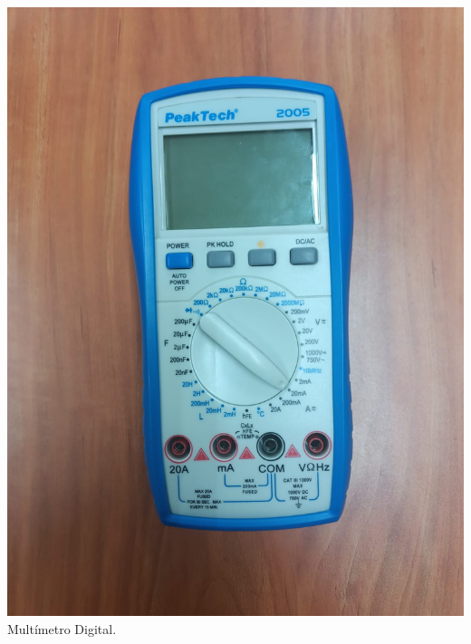 \documentclass[10pt]{article}
\begin{document}
\begin{multicols}{2}
\begin{center}

	\includegraphics[scale = 0.1]{Imagenes/Material/MultiD.jpeg}\\
	Multímetro Digital.


\end{center}
\end{multicols}
\end{document}
